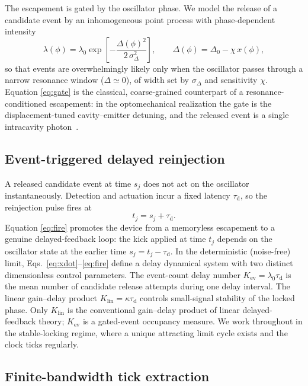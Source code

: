 \documentclass[aps,pre,reprint,amsmath,amssymb,floatfix,nofootinbib]{revtex4-2}
\newcommand{\taud}{\tau_{\mathrm{d}}}
\begin{document}
The escapement is gated by the oscillator phase. We model the release of
a candidate event by an inhomogeneous point process with phase-dependent
intensity
\begin{equation}
  \lambda(\phi) = \lambda_0
  \exp\!\left[-\frac{\Delta(\phi)^2}{2\,\sigma_\Delta^2}\right],
  \qquad
  \Delta(\phi) = \Delta_0 - \chi\,x(\phi),
  \label{eq:gate}
\end{equation}
so that events are overwhelmingly likely only when the oscillator passes
through a narrow resonance window ($\Delta\simeq 0$), of width set by
$\sigma_\Delta$ and sensitivity $\chi$. Equation \eqref{eq:gate} is the
classical, coarse-grained counterpart of a resonance-conditioned
escapement: in the optomechanical realization the gate is the
displacement-tuned cavity--emitter detuning, and the released event is a
single intracavity photon~\cite{Brunelli2026}.

\subsection{Event-triggered delayed reinjection}

A released candidate event at time $s_j$ does not act on the oscillator
instantaneously. Detection and actuation incur a fixed latency $\taud$,
so the reinjection pulse fires at
\begin{equation}
  t_{j} = s_{j} + \taud .
  \label{eq:fire}
\end{equation}
Equation \eqref{eq:fire} promotes the device from a memoryless escapement
to a genuine delayed-feedback loop: the kick applied at time $t_j$
depends on the oscillator state at the earlier time $s_j=t_j-\taud$. In
the deterministic (noise-free) limit, Eqs.~\eqref{eq:xdot}--\eqref{eq:fire}
define a delay dynamical system with two distinct dimensionless control
parameters. The event-count delay number
$K_{\mathrm{ev}}=\lambda_0\taud$ is the mean number of candidate release
attempts during one delay interval. The linear gain--delay product
$K_{\mathrm{lin}}=\kappa\taud$ controls small-signal stability of the locked
phase. Only $K_{\mathrm{lin}}$ is the conventional gain--delay product of
linear delayed-feedback theory; $K_{\mathrm{ev}}$ is a gated-event occupancy
measure. We work throughout in the stable-locking regime, where a unique
attracting limit cycle exists and the clock ticks regularly.

\subsection{Finite-bandwidth tick extraction}
\end{document}
